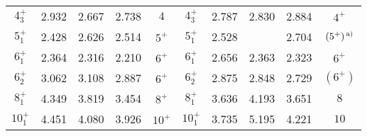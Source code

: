\begin{table}[htbp]
\begin{center}
\begin{minipage}[t]{5in}
\begin{tabular}{ccccc|ccccc}
$4^{+}_{3}$ & 2.932 & 2.667 & 2.738 & $4$ &
$4^{+}_{3}$ & 2.787 & 2.830 & 2.884 & $4^{+}$ \\
$5^{+}_{1}$ & 2.428 & 2.626 & 2.514 & $5^{+}$ &
$5^{+}_{1}$ & 2.528 &       & 2.704 & $(5^{+})^{\,{\rm a})}$ \\
$6^{+}_{1}$ & 2.364 & 2.316 & 2.210 & $6^{+}$ &
$6^{+}_{1}$ & 2.656 & 2.363 & 2.323 & $6^{+}$ \\
$6^{+}_{2}$ & 3.062 & 3.108 & 2.887 & $6^{+}$ &
$6^{+}_{2}$ & 2.875 & 2.848 & 2.729 & $(6^{+})$ \\
$8^{+}_{1}$ & 4.349 & 3.819 & 3.454 & $8^{+}$ &
$8^{+}_{1}$ & 3.636 & 4.193 & 3.651 & $8$ \\
$10^{+}_{1}$ & 4.451 &4.080& 3.926 & $10^{+}$ &
$10^{+}_{1}$ & 3.735 & 5.195 & 4.221 & $10$ \\
\hline
\end{tabular}
\end{minipage}
\label{tab:even-3}
\end{center}
\end{table}

